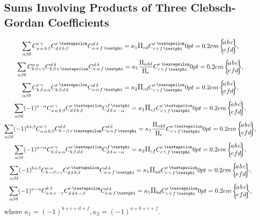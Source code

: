 \subsection{Sums Involving Products of Three Clebsch-Gordan Coefficients}\label{sec:8.7.3}
\begin{gather}
\sum_{\alpha \beta \delta} \clebsch{a}{\alpha}{b}{\beta}{c}{\gamma} \clebsch{d}{\delta}{b}{\beta}{e}{\varepsilon} \clebsch{a}{\alpha}{f}{\varphi}{d}{\delta}=\kappa_{1} \Fact{c d} \clebsch{c}{\gamma}{f}{\varphi}{e}{\varepsilon}\sixj{a}{b}{c}{e}{f}{d}, \label{eq:8:7:12}\\
\sum_{\alpha \beta \delta} \clebsch{b}{\beta}{c}{\gamma}{a}{\alpha} \clebsch{b}{\beta}{e}{\varepsilon}{d}{\delta} \clebsch{a}{\alpha}{f}{\varphi}{d}{\delta}=\kappa_{1} \frac{\Fact{a\dd d}}{\Fact{e}} \clebsch{c}{\gamma}{f}{\varphi}{e}{\varepsilon}\sixj{a}{b}{c}{e}{f}{d}, \label{eq:8:7:13}\\
\sum_{\alpha \beta \delta} 
\clebsch{b}{\beta}{a}{\alpha}{c}{\gamma} 
\clebsch{b}{\beta}{d}{\delta}{e}{\varepsilon} 
\clebsch{a}{\alpha}{f}{\varphi}{d}{\delta}
=\kappa_{2} \Fact{c d} 
\clebsch{c}{\gamma}{f}{\varphi}{e}{\varepsilon}
\sixj{a}{b}{c}{e}{f}{d}, \label{eq:8:7:14}\\
\sum_{\alpha \beta \delta}(-1)^{a-\alpha} \clebsch{a}{\alpha}{b}{\beta}{c}{\gamma} \clebsch{d}{\delta}{b}{\beta}{e}{\varepsilon} \clebsch{d}{\delta}{a}{-\alpha}{f}{\varphi}=\kappa_{1} \Fact{c f} \clebsch{c}{\gamma}{f}{\varphi}{e}{\varepsilon}\sixj{a}{b}{c}{e}{f}{d}, \label{eq:8:7:15}\\
\sum_{\alpha \beta \delta}(-1)^{b+\beta} \clebsch{a}{\alpha}{b}{\beta}{c}{\gamma} \clebsch{b}{-\beta}{e}{\varepsilon}{d}{\delta} \clebsch{a}{\alpha}{f}{\varphi}{d}{\delta}=\kappa_{1} \frac{\Fact{c\dd d}}{\Fact{e}} \clebsch{c}{\gamma}{f}{\varphi}{e}{\varepsilon}\sixj{a}{b}{c}{e}{f}{d}, \label{eq:8:7:16}\\
\sum_{\alpha \beta \delta}(-1)^{a-\alpha} \clebsch{b}{\beta}{a}{\alpha}{c}{\gamma} \clebsch{b}{\beta}{d}{\delta}{e}{\varepsilon} \clebsch{d}{\delta}{a}{-\alpha}{f}{\varphi}=\kappa_{2} \Fact{c f} \clebsch{c}{\gamma}{f}{\varphi}{e}{\varepsilon}
\sixj{a}{b}{c}{e}{f}{d}, \label{eq:8:7:17}\\
\sum_{\alpha \beta \delta}(-1)^{b+\beta} \clebsch{b}{-\beta}{c}{\gamma}{a}{\alpha} \clebsch{d}{\delta}{b}{\beta}{e}{\varepsilon} \clebsch{a}{\alpha}{f}{\varphi}{d}{\delta}=\kappa_{1} \Fact{a d} \clebsch{c}{\gamma}{f}{\varphi}{e}{\varepsilon}
\sixj{a}{b}{c}{e}{f}{d}, \label{eq:8:7:18}\\
\sum_{\alpha \beta \delta}(-1)^{a-\alpha} \clebsch{a}{\alpha}{c}{-\gamma}{b}{\beta} \clebsch{d}{\delta}{b}{-\beta}{e}{\varepsilon} \clebsch{a}{\alpha}{f}{\varphi}{d}{\delta}=\kappa_{1} \Fact{b d} \clebsch{c}{\gamma}{f}{\varphi}{e}{\varepsilon}\sixj{a}{b}{c}{e}{f}{d}, \label{eq:8:7:19}
\end{gather}
where $\kappa_{1}=(-1)^{b+c+d+f}, \kappa_{2}=(-1)^{a+b+e+f}$.\\

